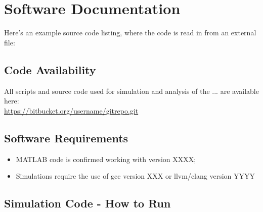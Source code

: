 \chapter{Software Documentation}




Here's an example source code listing, where the code is read in from an external file:



\section{Code Availability}
All scripts and source code used for simulation and analysis of the ... are available here:\\

\sloppy %
\url{https://bitbucket.org/username/gitrepo.git}\\

\section{Software Requirements}
\begin{itemize}
\item MATLAB code is confirmed working with version XXXX;
\item Simulations require the use of gcc version XXX or llvm/clang version YYYY
\end{itemize}

\section{Simulation Code - How to Run}

